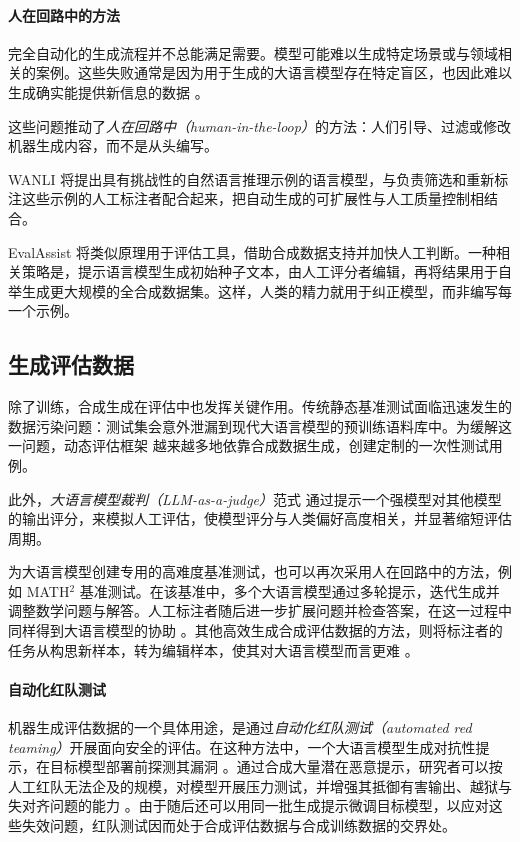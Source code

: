 \paragraph{人在回路中的方法}
完全自动化的生成流程并不总能满足需要。模型可能难以生成特定场景或与领域相关的案例。这些失败通常是因为用于生成的大语言模型存在特定盲区，也因此难以生成确实能提供新信息的数据 \citep{lippmann2024illuminatingblindspotslanguage}。

这些问题推动了{\em 人在回路中（human-in-the-loop）}的方法：人们引导、过滤或修改机器生成内容，而不是从头编写。

WANLI \citep{liu-etal-2022-wanli} 将提出具有挑战性的自然语言推理示例的语言模型，与负责筛选和重新标注这些示例的人工标注者配合起来，把自动生成的可扩展性与人工质量控制相结合。

EvalAssist \citep{santillan-cooper-etal-2025-synthetic} 将类似原理用于评估工具，借助合成数据支持并加快人工判断。一种相关策略是，提示语言模型生成初始种子文本，由人工评分者编辑，再将结果用于自举生成更大规模的全合成数据集。这样，人类的精力就用于纠正模型，而非编写每一个示例。



\subsection{生成评估数据}
除了训练，合成生成在评估中也发挥关键作用。传统静态基准测试面临迅速发生的数据污染问题：测试集会意外泄漏到现代大语言模型的预训练语料库中。为缓解这一问题，动态评估框架 \citep{kiela-etal-2021-dynabench} 越来越多地依靠合成数据生成，创建定制的一次性测试用例。

此外，{\em 大语言模型裁判（LLM-as-a-judge）}范式 \citep{zheng2024judging} 通过提示一个强模型对其他模型的输出评分，来模拟人工评估，使模型评分与人类偏好高度相关，并显著缩短评估周期。

为大语言模型创建专用的高难度基准测试，也可以再次采用人在回路中的方法，例如 MATH$^2$ 基准测试。在该基准中，多个大语言模型通过多轮提示，迭代生成并调整数学问题与解答。人工标注者随后进一步扩展问题并检查答案，在这一过程中同样得到大语言模型的协助 \citep{shah2024ai}。其他高效生成合成评估数据的方法，则将标注者的任务从构思新样本，转为编辑样本，使其对大语言模型而言更难 \citep{yuan2021synthbio}。

\paragraph{自动化红队测试}
机器生成评估数据的一个具体用途，是通过{\em 自动化红队测试（automated red teaming）}开展面向安全的评估。在这种方法中，一个大语言模型生成对抗性提示，在目标模型部署前探测其漏洞 \citep{ganguli2022redteaminglanguagemodels}。通过合成大量潜在恶意提示，研究者可以按人工红队无法企及的规模，对模型开展压力测试，并增强其抵御有害输出、越狱与失对齐问题的能力 \citep{perez-etal-2022-red}。由于随后还可以用同一批生成提示微调目标模型，以应对这些失效问题，红队测试因而处于合成评估数据与合成训练数据的交界处。


